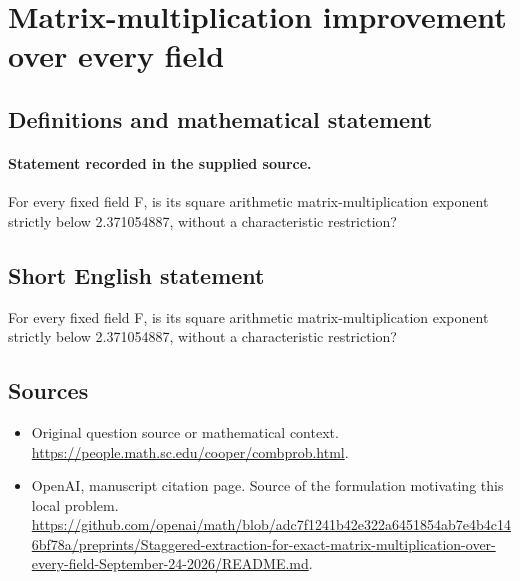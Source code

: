 \documentclass[11pt]{article}
\begin{document}
\section*{Matrix-multiplication improvement over every field}\label{statement}
\subsection{Definitions and mathematical statement}
\paragraph{Statement recorded in the supplied source.}
For every fixed field F, is its square arithmetic matrix-multiplication exponent strictly below 2.371054887, without a characteristic restriction?
\subsection{Short English statement}
For every fixed field F, is its square arithmetic matrix-multiplication exponent strictly below 2.371054887, without a characteristic restriction?
\subsection{Sources}
\begin{itemize}
\item[S1] Original question source or mathematical context.
\url{https://people.math.sc.edu/cooper/combprob.html}.
\item[S2] OpenAI, manuscript citation page. Source of the formulation motivating this local problem.
\url{https://github.com/openai/math/blob/adc7f1241b42e322a6451854ab7e4b4c146bf78a/preprints/Staggered-extraction-for-exact-matrix-multiplication-over-every-field-September-24-2026/README.md}.
\end{itemize}
\end{document}
